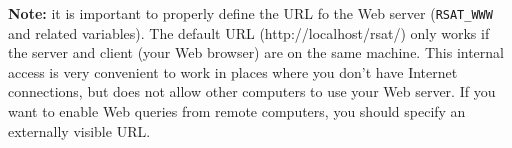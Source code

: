 \begin{enumerate}
  \textbf{Note:} it is important to properly define the URL fo the Web
  server (\texttt{RSAT\_WWW} and related variables). The default URL
  (http://localhost/rsat/) only works if the server and client (your
  Web browser) are on the same machine. This internal access is very
  convenient to work in places where you don't have Internet
  connections, but does not allow other computers to use your Web
  server.  If you want to enable Web queries from remote computers,
  you should specify an externally visible URL.

\end{enumerate}

